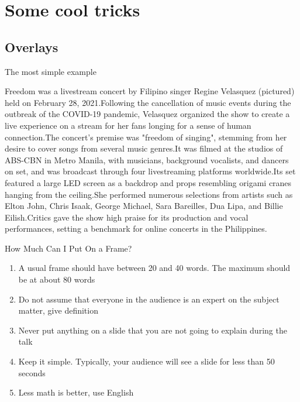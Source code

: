 \section{Some cool tricks}
\subsection{Overlays}

\begin{frame}{The most simple example}

    \small \centering Freedom was a livestream concert by Filipino singer Regine Velasquez (pictured) held on February 28, 2021.\pause Following the cancellation of music events during the outbreak of the COVID-19 pandemic, Velasquez organized the show to create a live experience on a stream for her fans longing for a sense of human connection.\pause The concert's premise was "freedom of singing", stemming from her desire to cover songs from several music genres.\pause It was filmed at the studios of ABS-CBN in Metro Manila, with musicians, background vocalists, and dancers on set, and was broadcast through four livestreaming platforms worldwide.\pause Its set featured a large LED screen as a backdrop and props resembling origami cranes hanging from the ceiling.\pause She performed numerous selections from artists such as Elton John, Chris Isaak, George Michael, Sara Bareilles, Dua Lipa, and Billie Eilish.\pause Critics gave the show high praise for its production and vocal performances, setting a benchmark for online concerts in the Philippines.
    
\end{frame}


\begin{frame}{How Much Can I Put On a Frame?}

    \begin{enumerate}
        \item<1->  A usual frame should have between 20 and 40 words. The maximum should be at about 80 words
        \item<2->  Do not assume that everyone in the audience is an expert on the subject matter, give definition
        \item<3->  Never put anything on a slide that you are not going to explain during the talk
        \item<4->  Keep it simple. Typically, your audience will see a slide for less than 50 seconds
        \item<5->  Less math is better, use English
    \end{enumerate}
    
\end{frame}

